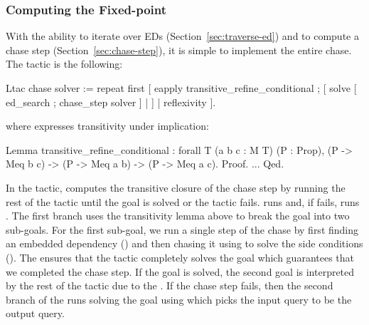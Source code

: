 \documentclass{sigplanconf}
\newcommand{\ltac}[0]{\ensuremath{\mathcal{L}_{\mathrm{tac}}}}
\begin{document}
\subsubsection{Computing the Fixed-point}
With the ability to iterate over EDs (Section~\ref{sec:traverse-ed}) and to compute a chase step (Section~\ref{sec:chase-step}), it is simple to implement the entire chase.
The tactic is the following:
\begin{coq}
Ltac chase solver :=
  repeat first
    [ eapply transitive_refine_conditional ;
      [ solve [ ed_search ; chase_step solver ]
      | ]
    | reflexivity ].
\end{coq}
where  expresses transitivity under implication:
\begin{coq}
Lemma transitive_refine_conditional
: forall {T} (a b c : M T) (P : Prop),
   (P -> Meq b c) -> (P -> Meq a b) -> (P -> Meq a c).
Proof. ... Qed.
\end{coq}
In the  tactic,  computes the transitive closure of the chase step by running the rest of the tactic until the goal is solved or the tactic fails.
 runs  and, if  fails, runs .
The first branch uses the transitivity lemma above to break the goal into two sub-goals.
For the first sub-goal, we run a single step of the chase by first finding an embedded dependency () and then chasing it using  to solve the side conditions ().
The  ensures that the tactic completely solves the goal which guarantees that we completed the chase step.
If the goal is solved, the second goal is interpreted by the rest of the tactic due to the .
If the chase step fails, then the second branch of the  runs solving the goal using  which picks the input query to be the output query.

\end{document}

